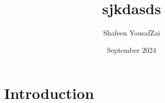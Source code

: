 \documentclass{article}
\title{sjkdasds}
\author{Shafeen YousafZai}
\date{September 2024}
\begin{document}
\maketitle

\section{Introduction}
\end{document}
